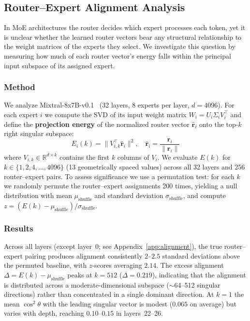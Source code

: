 
\subsection{Router--Expert Alignment Analysis}

In MoE architectures the router decides which expert processes each token, yet it is unclear whether the learned router vectors bear any structural relationship to the weight matrices of the experts they select. We investigate this question by measuring how much of each router vector's energy falls within the principal input subspace of its assigned expert.

\subsubsection{Method}

We analyze Mixtral-8x7B-v0.1~\cite{jiang2024mixtral} (32 layers, 8 experts per layer, $d{=}4096$). For each expert $i$ we compute the SVD of its input weight matrix $W_i = U_i \Sigma_i V_i^\top$ and define the \textbf{projection energy} of the normalized router vector $\hat{\mathbf{r}}_i$ onto the top-$k$ right singular subspace:
\begin{equation}
    E_i(k) = \| V_{i,k}^\top \hat{\mathbf{r}}_i \|^2, \quad \hat{\mathbf{r}}_i = \frac{\mathbf{r}_i}{\|\mathbf{r}_i\|}
\end{equation}
where $V_{i,k} \in \mathbb{R}^{d \times k}$ contains the first $k$ columns of $V_i$. We evaluate $E(k)$ for $k \in \{1, 2, 4, \ldots, 4096\}$ (13 geometrically spaced values) across all 32 layers and 256 router--expert pairs. To assess significance we use a permutation test: for each $k$ we randomly permute the router--expert assignments 200 times, yielding a null distribution with mean $\mu_{\text{shuffle}}$ and standard deviation $\sigma_{\text{shuffle}}$, and compute $z = (E(k) - \mu_{\text{shuffle}}) / \sigma_{\text{shuffle}}$.

\subsubsection{Results}

Across all layers (except layer~0; see Appendix~\ref{app:alignment}), the true router--expert pairing produces alignment consistently $2$--$2.5$ standard deviations above the permuted baseline, with $z$-scores averaging $2.14$. The excess alignment $\Delta = E(k) - \mu_{\text{shuffle}}$ peaks at $k{=}512$ ($\Delta = 0.219$), indicating that the alignment is distributed across a moderate-dimensional subspace ($\sim$64--512 singular directions) rather than concentrated in a single dominant direction. At $k{=}1$ the mean $\cos^2\theta$ with the leading singular vector is modest ($0.065$ on average) but varies with depth, reaching $0.10$--$0.15$ in layers~22--26.

